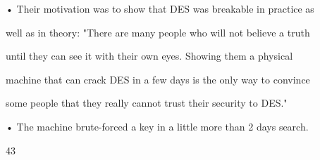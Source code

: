 \documentclass{article}
\begin{document}

• Their motivation was to show that DES was breakable in practice as 

well as in theory: "There are many people who will not believe a truth 

until they can see it with their own eyes. Showing them a physical 

machine that can crack DES in a few days is the only way to convince 

some people that they really cannot trust their security to DES." 

• The machine brute-forced a key in a little more than 2 days search. 

43
\end{document}
